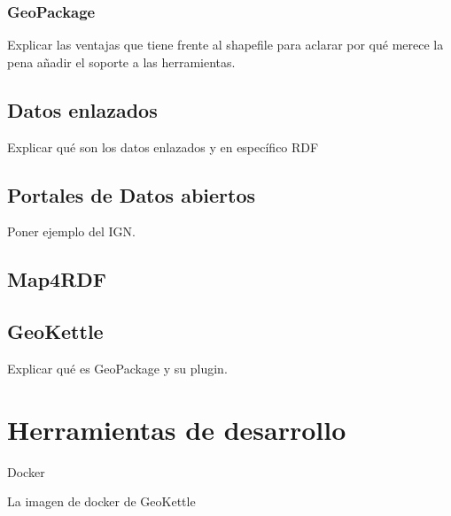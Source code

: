 \subsubsection{GeoPackage}
Explicar las ventajas que tiene frente al shapefile para aclarar
por qué merece la pena añadir el soporte a las herramientas.

\subsection{Datos enlazados}
Explicar qué son los datos enlazados y en específico RDF

\subsection{Portales de Datos abiertos}
Poner ejemplo del IGN.

\subsection{Map4RDF}

\subsection{GeoKettle}
Explicar qué es GeoPackage y su plugin.

\section{Herramientas de desarrollo}
Docker

La imagen de docker de GeoKettle


